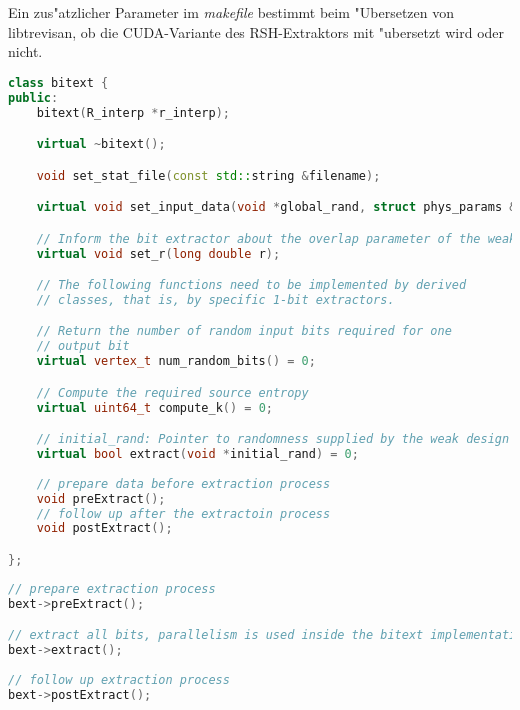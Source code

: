 Ein zus"atzlicher Parameter im \emph{makefile} bestimmt beim "Ubersetzen von libtrevisan, ob die CUDA-Variante des RSH-Extraktors mit "ubersetzt wird oder nicht.

\begin{minipage}{\textwidth}
\vspace{1cm}

\begin{lstlisting}[language=C++,captionpos=b,backgroundcolor=\color{gray!20}, caption=\"Anderungsvorschlag f"ur die Klasste \texttt{bitext}, label=lst:codevorschlag]
class bitext {
public:
	bitext(R_interp *r_interp);

	virtual ~bitext();

	void set_stat_file(const std::string &filename);

	virtual void set_input_data(void *global_rand, struct phys_params &pp);

	// Inform the bit extractor about the overlap parameter of the weak design
	virtual void set_r(long double r);

	// The following functions need to be implemented by derived
	// classes, that is, by specific 1-bit extractors.

	// Return the number of random input bits required for one
	// output bit
	virtual vertex_t num_random_bits() = 0;

	// Compute the required source entropy
	virtual uint64_t compute_k() = 0;

	// initial_rand: Pointer to randomness supplied by the weak design
	virtual bool extract(void *initial_rand) = 0;
	
	// prepare data before extraction process 
	void preExtract();
	// follow up after the extractoin process
	void postExtract();

};
\end{lstlisting}
\vspace{.5cm}
\begin{lstlisting}[language=C++,captionpos=b,backgroundcolor=\color{gray!20}, caption=\"Anderungsvorschlag f"ur Extraktionsprozess, label=lst:codevorschlag2]
// prepare extraction process
bext->preExtract();

// extract all bits, parallelism is used inside the bitext implementation
bext->extract();
	
// follow up extraction process
bext->postExtract();
\end{lstlisting}

\end{minipage}